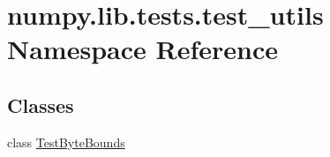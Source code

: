 \hypertarget{namespacenumpy_1_1lib_1_1tests_1_1test__utils}{}\section{numpy.\+lib.\+tests.\+test\+\_\+utils Namespace Reference}
\label{namespacenumpy_1_1lib_1_1tests_1_1test__utils}
\subsection*{Classes}
\begin{DoxyCompactItemize}
\item 
class \hyperlink{classnumpy_1_1lib_1_1tests_1_1test__utils_1_1TestByteBounds}{Test\+Byte\+Bounds}
\end{DoxyCompactItemize}
